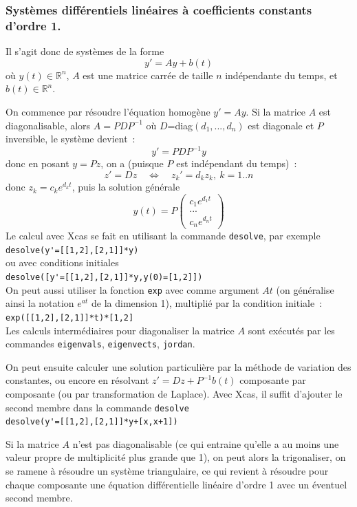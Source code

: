 \documentclass[a4paper,11pt]{article}
\newcommand{\R}{{\mathbb{R}}}
\begin{document}
\begin{giacjshere}
\subsubsection{Syst\`emes diff\'erentiels lin\'eaires \`a coefficients
constants d'ordre 1.}
Il s'agit donc de syst\`emes de la forme
$$ y'=Ay+b(t)$$
o\`u $y(t)\in \R^n$, $A$ est une matrice carr\'ee de taille $n$ 
ind\'ependante du temps, et $b(t) \in \R^n$.

On commence par r\'esoudre l'\'equation homog\`ene $y'=Ay$.
Si la matrice $A$ est diagonalisable, alors $A=PDP^{-1}$ o\`u
$D$=diag$(d_1,...,d_n)$ est diagonale et $P$ inversible, le syst\`eme devient~:
$$ y'=PDP^{-1} y$$
donc en posant $y=Pz$, on a (puisque $P$ est ind\'ependant du temps)~:
$$ z'=Dz \quad \Leftrightarrow \quad z_k'=d_kz_k, \ k=1..n$$
donc $z_k=c_k e^{d_kt}$, puis la solution g\'en\'erale
$$y(t)=P\left( \begin{array}{c} c_1 e^{d_1t} \\ ... \\c_n e^{d_nt}
\end{array} \right)$$
Le calcul avec Xcas se fait en utilisant la commande \verb|desolve|,
par exemple\\
\verb|desolve(y'=[[1,2],[2,1]]*y)|\\
ou avec conditions initiales\\
\verb|desolve([y'=[[1,2],[2,1]]*y,y(0)=[1,2]])|\\
On peut aussi utiliser la fonction \verb|exp|
avec comme argument $At$ (on g\'en\'eralise ainsi 
la notation $e^{at}$ 
de la dimension 1), multipli\'e par la condition initiale~:\\
\verb|exp([[1,2],[2,1]]*t)*[1,2]|\\
Les calculs interm\'ediaires pour diagonaliser la matrice $A$ sont
ex\'ecut\'es par les commandes \verb|eigenvals|, \verb|eigenvects|,
\verb|jordan|.

On peut ensuite calculer une solution particuli\`ere par la m\'ethode
de variation des constantes, ou encore en r\'esolvant 
$z'=Dz+P^{-1}b(t)$ composante par composante (ou par transformation
de Laplace). Avec Xcas,
il suffit d'ajouter le second membre dans la commande \verb|desolve|\\
\verb|desolve(y'=[[1,2],[2,1]]*y+[x,x+1])|

Si la matrice $A$ n'est pas diagonalisable (ce qui entraine
qu'elle a au moins une valeur propre de
multiplicit\'e plus grande que 1), on peut alors
la trigonaliser, on se ramene \`a r\'esoudre un syst\`eme
triangulaire, ce qui revient \`a r\'esoudre pour chaque
composante une \'equation
diff\'erentielle lin\'eaire d'ordre 1 avec un \'eventuel 
second membre. 


\end{giacjshere}
\end{document}
